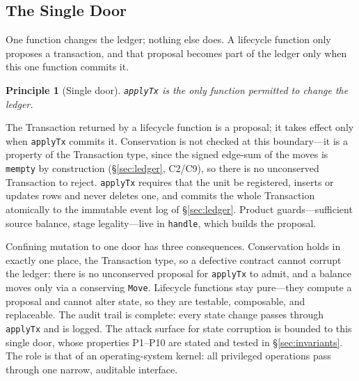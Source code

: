 \documentclass[11pt,a4paper]{article}
\newtheorem{principle}[definition]{Principle}
\begin{document}
\subsection{The Single Door}

One function changes the ledger; nothing else does. A lifecycle function only proposes a transaction, and that proposal becomes part of the ledger only when this one function commits it.

\begin{principle}[Single door]
\label{prin:executor}
\texttt{applyTx} is the only function permitted to change the ledger.
\end{principle}

The Transaction returned by a lifecycle function is a proposal; it takes effect only when \texttt{applyTx} commits it. Conservation is not checked at this boundary---it is a property of the Transaction type, since the signed edge-sum of the moves is \texttt{mempty} by construction (\S\ref{sec:ledger}, C2/C9), so there is no unconserved Transaction to reject. \texttt{applyTx} requires that the unit be registered, inserts or updates rows and never deletes one, and commits the whole Transaction atomically to the immutable event log of \S\ref{sec:ledger}. Product guards---sufficient source balance, stage legality---live in \texttt{handle}, which builds the proposal.

Confining mutation to one door has three consequences. Conservation holds in exactly one place, the Transaction type, so a defective contract cannot corrupt the ledger: there is no unconserved proposal for \texttt{applyTx} to admit, and a balance moves only via a conserving \texttt{Move}. Lifecycle functions stay pure---they compute a proposal and cannot alter state, so they are testable, composable, and replaceable. The audit trail is complete: every state change passes through \texttt{applyTx} and is logged. The attack surface for state corruption is bounded to this single door, whose properties P1--P10 are stated and tested in \S\ref{sec:invariants}. The role is that of an operating-system kernel: all privileged operations pass through one narrow, auditable interface.
\end{document}
